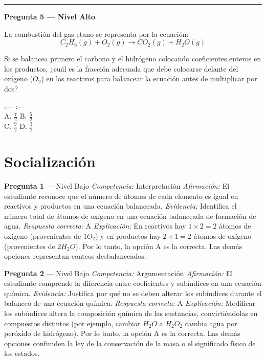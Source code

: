 \documentclass[
  spanish,
  letterpaper,
  12pt,
  oneside,
  open=any]{scrbook}
\newcommand{\setcolorsection}[2]{%
  \definecolor{currentsectionbg}{HTML}{#1}%
  \definecolor{currentsectionborder}{HTML}{#2}%
}
\begin{document}
\begin{center}\rule{0.5\linewidth}{0.5pt}\end{center}

\textbf{Pregunta 5 --- Nivel Alto}

La combustión del gas etano se representa por la ecuación:
\[C_2H_6(g) + O_2(g) \rightarrow CO_2(g) + H_2O(g)\]

Si se balancea primero el carbono y el hidrógeno colocando coeficientes
enteros en los productos, ¿cuál es la fracción adecuada que debe
colocarse delante del oxígeno (\(O_2\)) en los reactivos para balancear
la ecuación antes de multiplicar por dos?

:--- \textbar{} :--- \textbar{}\\
A. \(\frac{7}{2}\) \textbar{} B. \(\frac{5}{2}\) \textbar{}\\
C. \(\frac{9}{2}\) \textbar{} D. \(\frac{3}{2}\) \textbar{}

\setcolorsection{f0c4b8}{dcb0a4}

\section{Socialización}\label{socializaciuxf3n-1}

\textbf{Pregunta 1} --- Nivel Bajo \emph{Competencia:} Interpretación
\emph{Afirmación:} El estudiante reconoce que el número de átomos de
cada elemento es igual en reactivos y productos en una ecuación
balanceada. \emph{Evidencia:} Identifica el número total de átomos de
oxígeno en una ecuación balanceada de formación de agua. \emph{Respuesta
correcta:} A \emph{Explicación:} En reactivos hay \(1 \times 2 = 2\)
átomos de oxígeno (provenientes de \(1O_2\)) y en productos hay
\(2 \times 1 = 2\) átomos de oxígeno (provenientes de \(2H_2O\)). Por lo
tanto, la opción A es la correcta. Las demás opciones representan
conteos desbalanceados.

\textbf{Pregunta 2} --- Nivel Bajo \emph{Competencia:} Argumentación
\emph{Afirmación:} El estudiante comprende la diferencia entre
coeficientes y subíndices en una ecuación química. \emph{Evidencia:}
Justifica por qué no se deben alterar los subíndices durante el balanceo
de una ecuación química. \emph{Respuesta correcta:} A
\emph{Explicación:} Modificar los subíndices altera la composición
química de las sustancias, convirtiéndolas en compuestos distintos (por
ejemplo, cambiar \(H_2O\) a \(H_2O_2\) cambia agua por peróxido de
hidrógeno). Por lo tanto, la opción A es la correcta. Las demás opciones
confunden la ley de la conservación de la masa o el significado físico
de los estados.
\end{document}

